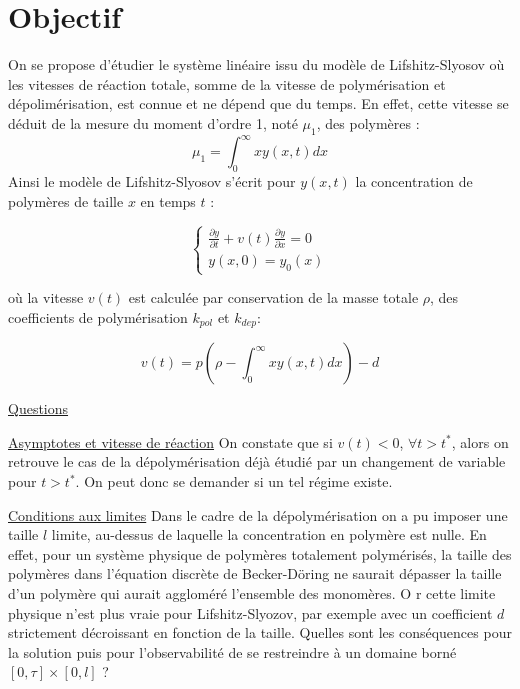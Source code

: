 \documentclass[a4paper]{article}
\theoremstyle{definition}
\theoremstyle{remark}
\newcommand{\pol}{p}
\newcommand{\dep}{d}
\begin{document}

\section{Objectif}

On se propose d'étudier le système linéaire issu du modèle de Lifshitz-Slyosov où les vitesses de réaction totale, somme de la vitesse de polymérisation et dépolimérisation, est connue et ne dépend que du temps. En effet, cette vitesse se déduit de la mesure du moment d'ordre 1, noté $\mu_1$, des polymères :
\[
\mu_1 = \int_0 ^\infty x y(x,t) dx
\]
Ainsi le modèle de Lifshitz-Slyosov s'écrit pour $y(x,t)$ la concentration de polymères de taille $x$ en temps $t$ :

\begin{equation}
\label{eq:general}
\begin{cases}
 \displaystyle \frac{\partial y}{\partial t}+ v(t) \frac{\partial y} {\partial x}  = 0  \\
 y(x,0) = y_{0} (x) 
\end{cases}
\end{equation}

où la vitesse $v(t)$ est calculée par conservation de la masse totale $\rho$, des coefficients de polymérisation $k_{pol}$ et $k_{dep}$:

\[
v(t) = \pol(\rho - \int_0 ^\infty x y(x,t) dx)-\dep
\]

\underline{Questions}

\underline{Asymptotes et vitesse de réaction} On constate que si $v(t)<0$, $\forall t > t^*$, 
alors on retrouve le cas de la dépolymérisation déjà étudié par un changement de variable pour $t > t^*$. 
On peut donc se demander si un tel régime existe.

\underline{Conditions aux limites} Dans le cadre de la dépolymérisation on a pu imposer une taille $l$ limite, 
au-dessus de laquelle la concentration en polymère est nulle. 
En effet, pour un système physique de polymères totalement polymérisés, 
la taille des polymères dans l'équation discrète de Becker-Döring ne saurait dépasser la taille d'un polymère 
qui aurait aggloméré l'ensemble des monomères. O
r cette limite physique n'est plus vraie pour Lifshitz-Slyozov, 
par exemple avec un coefficient $\dep$ strictement décroissant en fonction de la taille. 
Quelles sont les conséquences pour la solution puis pour l'observabilité de se restreindre à un domaine borné 
$[0, \tau] \times [0,l]$ ?
\end{document}
